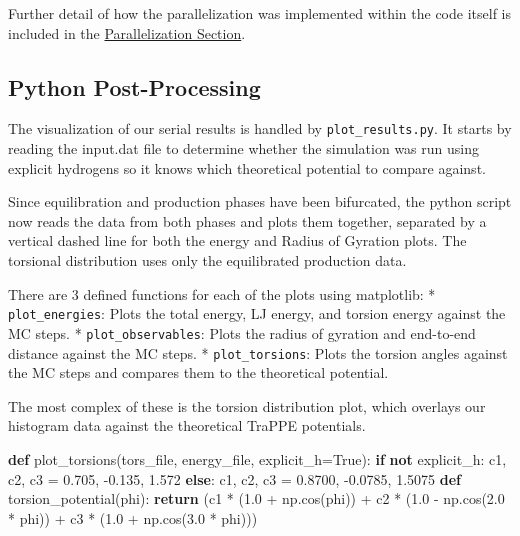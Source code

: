 \documentclass[
]{article}
\newenvironment{Shaded}{}{}
\newcommand{\ControlFlowTok}[1]{\textcolor[rgb]{0.00,0.44,0.13}{\textbf{#1}}}
\newcommand{\FloatTok}[1]{\textcolor[rgb]{0.25,0.63,0.44}{#1}}
\newcommand{\KeywordTok}[1]{\textcolor[rgb]{0.00,0.44,0.13}{\textbf{#1}}}
\newcommand{\NormalTok}[1]{#1}
\newcommand{\OperatorTok}[1]{\textcolor[rgb]{0.40,0.40,0.40}{#1}}
\newcommand{\VariableTok}[1]{\textcolor[rgb]{0.10,0.09,0.49}{#1}}
\begin{document}
Further detail of how the parallelization was implemented within the
code itself is included in the
\href{./EIA_Project2026_Report_GroupII.md\#parallelization-techniques}{Parallelization
Section}.

\subsection{Python Post-Processing}\label{python-post-processing}

The visualization of our serial results is handled by
\texttt{plot\_results.py}. It starts by reading the input.dat file to
determine whether the simulation was run using explicit hydrogens so it
knows which theoretical potential to compare against.

Since equilibration and production phases have been bifurcated, the
python script now reads the data from both phases and plots them
together, separated by a vertical dashed line for both the energy and
Radius of Gyration plots. The torsional distribution uses only the
equilibrated production data.

There are 3 defined functions for each of the plots using matplotlib: *
\texttt{plot\_energies}: Plots the total energy, LJ energy, and torsion
energy against the MC steps. * \texttt{plot\_observables}: Plots the
radius of gyration and end-to-end distance against the MC steps. *
\texttt{plot\_torsions}: Plots the torsion angles against the MC steps
and compares them to the theoretical potential.

The most complex of these is the torsion distribution plot, which
overlays our histogram data against the theoretical TraPPE potentials.

\begin{Shaded}
\begin{Highlighting}[]
\KeywordTok{def}\NormalTok{ plot\_torsions(tors\_file, energy\_file, explicit\_h}\OperatorTok{=}\VariableTok{True}\NormalTok{):}
    \ControlFlowTok{if} \KeywordTok{not}\NormalTok{ explicit\_h:}
\NormalTok{        c1, c2, c3 }\OperatorTok{=} \FloatTok{0.705}\NormalTok{, }\OperatorTok{{-}}\FloatTok{0.135}\NormalTok{, }\FloatTok{1.572}
    \ControlFlowTok{else}\NormalTok{:}
\NormalTok{        c1, c2, c3 }\OperatorTok{=} \FloatTok{0.8700}\NormalTok{, }\OperatorTok{{-}}\FloatTok{0.0785}\NormalTok{, }\FloatTok{1.5075}
    \KeywordTok{def}\NormalTok{ torsion\_potential(phi):}
        \ControlFlowTok{return}\NormalTok{ (c1 }\OperatorTok{*}\NormalTok{ (}\FloatTok{1.0} \OperatorTok{+}\NormalTok{ np.cos(phi))}
              \OperatorTok{+}\NormalTok{ c2 }\OperatorTok{*}\NormalTok{ (}\FloatTok{1.0} \OperatorTok{{-}}\NormalTok{ np.cos(}\FloatTok{2.0} \OperatorTok{*}\NormalTok{ phi))}
              \OperatorTok{+}\NormalTok{ c3 }\OperatorTok{*}\NormalTok{ (}\FloatTok{1.0} \OperatorTok{+}\NormalTok{ np.cos(}\FloatTok{3.0} \OperatorTok{*}\NormalTok{ phi)))}
\end{Highlighting}
\end{Shaded}
\end{document}

